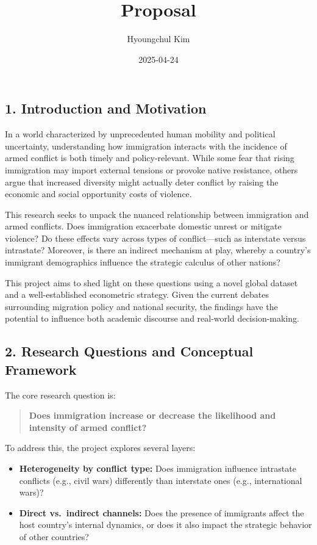 \documentclass[
  letterpaper,
  DIV=11,
  numbers=noendperiod]{scrartcl}
\title{Proposal}
\author{Hyoungchul Kim}
\date{2025-04-24}
\begin{document}
\maketitle


\subsection{1. Introduction and
Motivation}\label{introduction-and-motivation}

In a world characterized by unprecedented human mobility and political
uncertainty, understanding how immigration interacts with the incidence
of armed conflict is both timely and policy-relevant. While some fear
that rising immigration may import external tensions or provoke native
resistance, others argue that increased diversity might actually deter
conflict by raising the economic and social opportunity costs of
violence.

This research seeks to unpack the nuanced relationship between
immigration and armed conflicts. Does immigration exacerbate domestic
unrest or mitigate violence? Do these effects vary across types of
conflict---such as interstate versus intrastate? Moreover, is there an
indirect mechanism at play, whereby a country's immigrant demographics
influence the strategic calculus of other nations?

This project aims to shed light on these questions using a novel global
dataset and a well-established econometric strategy. Given the current
debates surrounding migration policy and national security, the findings
have the potential to influence both academic discourse and real-world
decision-making.

\subsection{2. Research Questions and Conceptual
Framework}\label{research-questions-and-conceptual-framework}

The core research question is:

\begin{quote}
\textbf{Does immigration increase or decrease the likelihood and
intensity of armed conflict?}
\end{quote}

To address this, the project explores several layers:

\begin{itemize}
\item
  \textbf{Heterogeneity by conflict type:} Does immigration influence
  intrastate conflicts (e.g., civil wars) differently than interstate
  ones (e.g., international wars)?
\item
  \textbf{Direct vs.~indirect channels:} Does the presence of immigrants
  affect the host country's internal dynamics, or does it also impact
  the strategic behavior of other countries?
\end{itemize}
\end{document}
